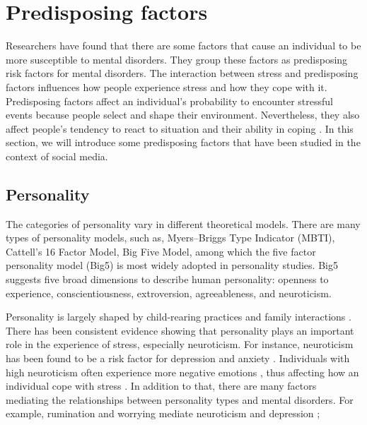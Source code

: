\section{Predisposing factors}
Researchers have found that there are some factors that cause an individual to be more susceptible to mental disorders. They group these factors as predisposing risk factors for mental disorders. The interaction between stress and predisposing factors influences how people experience stress and how they cope with it. Predisposing factors affect an individual's probability to encounter stressful events because people select and shape their environment. Nevertheless, they also affect people's tendency to react to situation and their ability in coping \cite{suls2005daily,vollrath2001personality,watson1999personality}. In this section, we will introduce some predisposing factors that have been studied in the context of social media. 

\subsection{Personality}
 The categories of personality vary in different theoretical models. There are many types of personality models, such as, Myers–Briggs Type Indicator (MBTI), Cattell’s 16 Factor Model, Big Five Model, among which the five factor personality model (Big5) is most widely adopted in personality studies. Big5 suggests five broad dimensions to describe human personality: openness to experience, conscientiousness, extroversion, agreeableness, and neuroticism. 

Personality is largely shaped by child-rearing practices and family interactions \cite{kluft1985childhood}.  There has been consistent evidence showing that personality plays an important role in the experience of stress, especially neuroticism. For instance, neuroticism has been found to be a risk factor for depression and anxiety \cite{talley1986association,cattell1961meaning}. Individuals with high neuroticism often experience more negative emotions \cite{larsen1991personality}, thus affecting how an individual cope with stress \cite{kiecolt2002emotions}.  In addition to that, there are many factors mediating the relationships between personality types and mental disorders. For example, rumination and worrying mediate neuroticism and depression \cite{roelofs2008rumination};

